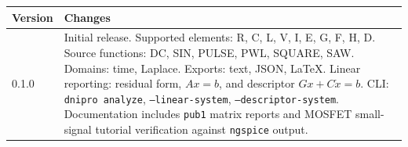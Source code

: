 \documentclass[11pt,a4paper]{article}
\newcommand{\code}[1]{\texttt{#1}}
\newcommand{\ngspice}{\texttt{ngspice}}
\begin{document}
\begin{longtable}{p{}p{}}
\toprule
Version & Changes \\
\midrule
0.1.0 & Initial release.
        Supported elements: R, C, L, V, I, E, G, F, H, D.
        Source functions: DC, SIN, PULSE, PWL, SQUARE, SAW.
        Domains: time, Laplace.
        Exports: text, JSON, LaTeX.
        Linear reporting: residual form, \(A x = b\), and descriptor
        \(Gx + C\dot{x} = b\).
        CLI: \texttt{dnipro analyze}, \texttt{--linear-system},
        \texttt{--descriptor-system}.
        Documentation includes \code{pub1} matrix reports and MOSFET
        small-signal tutorial verification against \ngspice{} output. \\
\bottomrule
\end{longtable}
\end{document}
